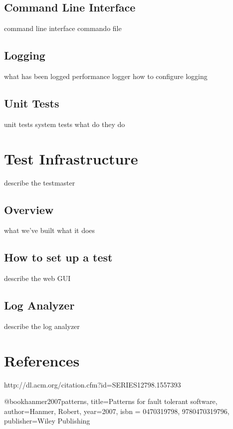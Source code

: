 \documentclass[a4paper]{article}
\begin{document}
\subsection{Command Line Interface}
command line interface commando file

\subsection{Logging}
what has been logged
performance logger
how to configure logging


\subsection{Unit Tests}
unit tests
system tests
what do they do


\section{Test Infrastructure}
describe the testmaster
\subsection{Overview}
what we've built
what it does

\subsection{How to set up a test}
describe the web GUI

\subsection{Log Analyzer}
describe the log analyzer



\section{References}


http://dl.acm.org/citation.cfm?id=SERIES12798.1557393

@book{hanmer2007patterns,
  title={Patterns for fault tolerant software},
  author={Hanmer, Robert},
  year={2007},
  isbn = {0470319798, 9780470319796},
  publisher={Wiley Publishing}
}

%
\end{document}
